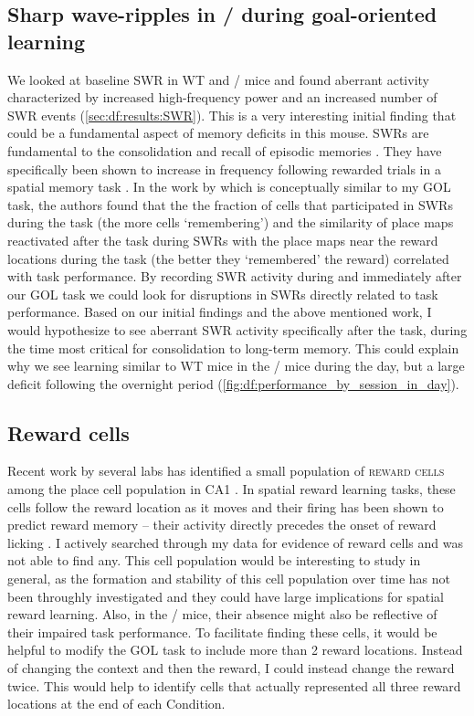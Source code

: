 \subsection{Sharp wave-ripples in \df/ during goal-oriented learning}
We looked at baseline \ac{SWR} in WT and \df/ mice and found aberrant activity characterized by increased high-frequency power and an increased number of \ac{SWR} events (\autoref{sec:df:results:SWR}).
This is a very interesting initial finding that could be a fundamental aspect of memory deficits in this mouse.
SWRs are fundamental to the consolidation and recall of episodic memories \citep[reviewed in,][]{Buzsaki2015}.
They have specifically been shown to increase in frequency following rewarded trials in a spatial memory task \citep{Singer2009}.
In the work by \citeauthor{Dupret2010a} which is conceptually similar to my \ac{GOL} task, the authors found that the the fraction of cells that participated in SWRs during the task (the more cells `remembering') and the similarity of place maps reactivated after the task during SWRs with the place maps near the reward locations during the task (the better they `remembered' the reward) correlated with task performance.
By recording \ac{SWR} activity during and immediately after our \ac{GOL} task we could  look for disruptions in SWRs directly related to task performance.
Based on our initial findings and the above mentioned work, I would hypothesize to see aberrant \ac{SWR} activity specifically after the task, during the time most critical for consolidation to long-term memory.
This could explain why we see learning similar to WT mice in the \df/ mice during the day, but a large deficit following the overnight period (\autoref{fig:df:performance_by_session_in_day}).

\subsection{Reward cells}
Recent work by several labs has identified a small population of \textsc{reward cells} among the place cell population in CA1 \citep{XXXX}.
In spatial reward learning tasks, these cells follow the reward location as it moves and their firing has been shown to predict reward memory -- their activity directly precedes the onset of reward licking \citep{XXXX}.
I actively searched through my data for evidence of reward cells and was not able to find any.
This cell population would be interesting to study in general, as the formation and stability of this cell population over time has not been throughly investigated and they could have large implications for spatial reward learning.
Also, in the \df/ mice, their absence might also be reflective of their impaired task performance.
To facilitate finding these cells, it would be helpful to modify the \ac{GOL} task to include more than 2 reward locations.
Instead of changing the context and then the reward, I could instead change the reward twice.
This would help to identify cells that actually represented all three reward locations at the end of each Condition.

